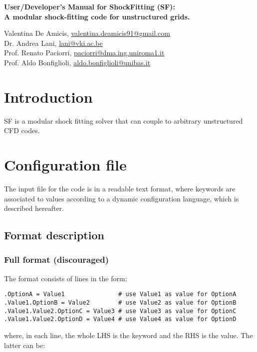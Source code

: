 \documentclass[11pt]{article}
\begin{document}
\pagestyle{empty}

\begin{center}
  {\fontsize{14}{20}\bf
    User/Developer's Manual for ShockFitting (SF): \\
    {\small A modular shock-fitting code for unstructured grids.} \\[10pt]}
\end{center}

\begin{center}
  Valentina De Amicis, \underline{valentina.deamicis91@gmail.com}\\
  Dr. Andrea Lani, \underline{lani@vki.ac.be}\\
  Prof. Renato Paciorri, \underline{paciorri@dma.ing.uniroma1.it}\\
  Prof. Aldo Bonfiglioli, \underline{aldo.bonfiglioli@unibas.it}
\end{center}


\section*{Introduction}

SF is a modular shock fitting solver that can couple to arbitrary unstructured CFD codes.

\section{Configuration file}

The input file for the code is in a readable text format, where keywords are associated 
to values according to a dynamic configuration language, which is described hereafter.

\subsection{Format description}

\subsubsection{Full format (discouraged)}\label{ssec:full_format}

The format consists of lines in the form:
\vspace{-0.2cm}
\begin{verbatim}
.OptionA = Value1               # use Value1 as value for OptionA
.Value1.OptionB = Value2        # use Value2 as value for OptionB
.Value1.Value2.OptionC = Value3 # use Value3 as value for OptionC
.Value1.Value2.OptionD = Value4 # use Value4 as value for OptionD
\end{verbatim} 
where, in each line, the whole LHS is the keyword and the RHS is the value. The
latter can be:
\end{document}
